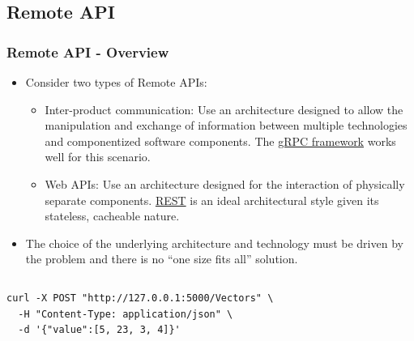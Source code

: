 \documentclass[t]{beamer}
\begin{document}
\subsection{Remote API}
\begin{frame}[fragile=singleslide]
  \frametitle{Remote API - Overview}
  \vspace{-10pt}

  \begin{itemize}
  \item Consider two types of Remote APIs:
    \begin{itemize}
    \item{Inter-product communication: Use an architecture designed to allow
      the manipulation and exchange of information between multiple
      technologies and componentized software
      components. The \href{https://grpc.io/}{gRPC framework} works well for this
      scenario.}
    \item{Web APIs: Use an architecture designed for the interaction of
       physically separate components. \href{https://restfulapi.net/}{REST} is
       an ideal architectural style given its stateless, cacheable nature.}
    \end{itemize}
  \item The choice of the underlying architecture and technology must be driven
    by the problem and there is no ``one size fits all'' solution.
  \end{itemize}

  \pyramidthree{}

  \vspace{-20pt}
  \begin{columns}[T]
    \begin{column}{.6\textwidth}
      \begin{example}
        \begin{lstlisting}[basicstyle=\scriptsize]
curl -X POST "http://127.0.0.1:5000/Vectors" \
  -H "Content-Type: application/json" \
  -d '{"value":[5, 23, 3, 4]}'
        \end{lstlisting}
      \end{example}
    \end{column}
    \begin{column}{.2\textwidth}
    \end{column}
  \end{columns}

\end{frame}
\end{document}
